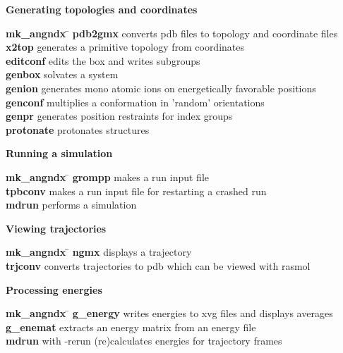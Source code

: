 \begin{description}
\item {\large\bf Generating topologies and coordinates}
\vspace{-2ex}\begin{tabbing}
{\bf mk\_angndx} \= \kill
{\bf pdb2gmx} \> converts pdb files to topology and coordinate files \\
{\bf x2top} \> generates a primitive topology from coordinates  \\
{\bf editconf} \> edits the box and writes subgroups  \\
{\bf genbox} \> solvates a system \\
{\bf genion} \> generates mono atomic ions on energetically favorable positions \\
{\bf genconf} \> multiplies a conformation in 'random' orientations \\
{\bf genpr} \> generates position restraints for index groups \\
{\bf protonate} \> protonates structures \\
\end{tabbing}\vspace{-2ex}

\item {\large\bf Running a simulation}
\vspace{-2ex}\begin{tabbing}
{\bf mk\_angndx} \= \kill
{\bf grompp} \> makes a run input file \\
{\bf tpbconv} \> makes a run input file for restarting a crashed run \\
{\bf mdrun} \> performs a simulation \\
\end{tabbing}\vspace{-2ex}

\item {\large\bf Viewing trajectories}
\vspace{-2ex}\begin{tabbing}
{\bf mk\_angndx} \= \kill
{\bf ngmx} \> displays a trajectory \\
{\bf trjconv} \> converts trajectories to {\eg} pdb which can be viewed with {\eg} rasmol \\
\end{tabbing}\vspace{-2ex}

\item {\large\bf Processing energies}
\vspace{-2ex}\begin{tabbing}
{\bf mk\_angndx} \= \kill
{\bf g\_energy} \> writes energies to xvg files and displays averages \\
{\bf g\_enemat} \> extracts an energy matrix from an energy file \\
{\bf mdrun} \> with -rerun (re)calculates energies for trajectory frames \\
\end{tabbing}\vspace{-2ex}


\end{description}
